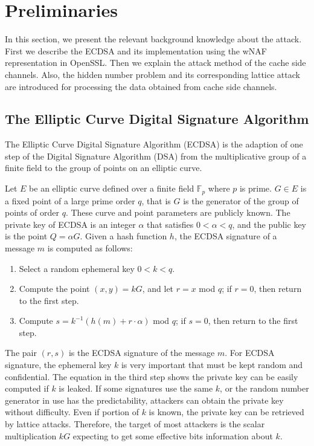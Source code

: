 \section{Preliminaries}
\label{sec:background}
In this section, we present the relevant background knowledge about the attack.
First we describe the ECDSA and its implementation using the wNAF representation in OpenSSL.
Then we explain the attack method of the cache side channels.
Also, the hidden number problem and its corresponding lattice attack are introduced
 for processing the data obtained from cache side channels.

\subsection{The Elliptic Curve Digital Signature Algorithm}
\label{intro_ecdsa}
The Elliptic Curve Digital Signature Algorithm (ECDSA) \cite{Johnson2001, ansi2005} is the adaption of one step of the Digital Signature Algorithm (DSA) \cite{DSS186} from the multiplicative group of a finite field to the group of points on an elliptic curve.

Let $E$ be an elliptic curve defined over a finite field $\mathbb{F}_{p}$ where $p$ is prime.
$G \in E$ is a fixed point of a large prime order $q$, that is $G$ is the generator of the group of points of order $q$.
These curve and point parameters are publicly known.
The private key of ECDSA is an integer $\alpha$ that satisfies $0 < \alpha < q$,
 and the public key is the point $Q = \alpha G$.
Given a hash function $h$, the ECDSA signature of a message $m$ is computed as follows:
\begin{enumerate}
  \item
    Select a random ephemeral key $0 < k < q$.
  \item
    Compute the point $(x, y) = kG$, and let $r = x$ mod $q$;
    if $r = 0$, then return to the first step.
  \item
    Compute $s = k^{-1} (h(m) + r\cdot\alpha)$ mod $q$;
    if $s = 0$, then return to the first step.
\end{enumerate}

The pair $(r, s)$ is the ECDSA signature of the message $m$.
For ECDSA signature, the ephemeral key $k$ is very important that must be kept random and confidential.
The equation in the third step shows the private key can be easily computed if $k$ is leaked.
If some signatures use the same $k$, or the random number generator in use has the predictability, attackers can obtain the private key without difficulty.
Even if portion of $k$ is known, the private key can be retrieved by lattice attacks.
Therefore, the target of most attackers is the scalar multiplication $kG$ expecting to get some effective bits information about $k$.

